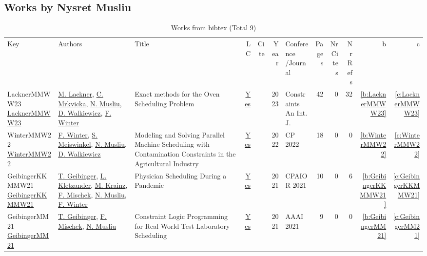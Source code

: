 \subsection{Works by Nysret Musliu}
\label{sec:a45}
{\scriptsize
\begin{longtable}{>{\raggedright\arraybackslash}p{3cm}>{\raggedright\arraybackslash}p{6cm}>{\raggedright\arraybackslash}p{6.5cm}rrrp{2.5cm}rrrrr}
\rowcolor{white}\caption{Works from bibtex (Total 9)}\\ \toprule
\rowcolor{white}Key & Authors & Title & LC & Cite & Year & \shortstack{Conference\\/Journal} & Pages & \shortstack{Nr\\Cites} & \shortstack{Nr\\Refs} & b & c \\ \midrule\endhead
\bottomrule
\endfoot
LacknerMMWW23 \href{https://doi.org/10.1007/s10601-023-09347-2}{LacknerMMWW23} & \hyperref[auth:a62]{M. Lackner}, \hyperref[auth:a63]{C. Mrkvicka}, \hyperref[auth:a45]{N. Musliu}, \hyperref[auth:a46]{D. Walkiewicz}, \hyperref[auth:a43]{F. Winter} & Exact methods for the Oven Scheduling Problem & \href{works/LacknerMMWW23.pdf}{Yes} & \cite{LacknerMMWW23} & 2023 & Constraints An Int. J. & 42 & 0 & 32 & \ref{b:LacknerMMWW23} & \ref{c:LacknerMMWW23}\\
WinterMMW22 \href{https://doi.org/10.4230/LIPIcs.CP.2022.41}{WinterMMW22} & \hyperref[auth:a43]{F. Winter}, \hyperref[auth:a44]{S. Meiswinkel}, \hyperref[auth:a45]{N. Musliu}, \hyperref[auth:a46]{D. Walkiewicz} & Modeling and Solving Parallel Machine Scheduling with Contamination Constraints in the Agricultural Industry & \href{works/WinterMMW22.pdf}{Yes} & \cite{WinterMMW22} & 2022 & CP 2022 & 18 & 0 & 0 & \ref{b:WinterMMW22} & \ref{c:WinterMMW22}\\
GeibingerKKMMW21 \href{https://doi.org/10.1007/978-3-030-78230-6\_29}{GeibingerKKMMW21} & \hyperref[auth:a77]{T. Geibinger}, \hyperref[auth:a78]{L. Kletzander}, \hyperref[auth:a79]{M. Krainz}, \hyperref[auth:a80]{F. Mischek}, \hyperref[auth:a45]{N. Musliu}, \hyperref[auth:a43]{F. Winter} & Physician Scheduling During a Pandemic & \href{works/GeibingerKKMMW21.pdf}{Yes} & \cite{GeibingerKKMMW21} & 2021 & CPAIOR 2021 & 10 & 0 & 6 & \ref{b:GeibingerKKMMW21} & \ref{c:GeibingerKKMMW21}\\
GeibingerMM21 \href{https://doi.org/10.1609/aaai.v35i7.16789}{GeibingerMM21} & \hyperref[auth:a77]{T. Geibinger}, \hyperref[auth:a80]{F. Mischek}, \hyperref[auth:a45]{N. Musliu} & Constraint Logic Programming for Real-World Test Laboratory Scheduling & \href{works/GeibingerMM21.pdf}{Yes} & \cite{GeibingerMM21} & 2021 & AAAI 2021 & 9 & 0 & 0 & \ref{b:GeibingerMM21} & \ref{c:GeibingerMM21}\\

\end{longtable}}
